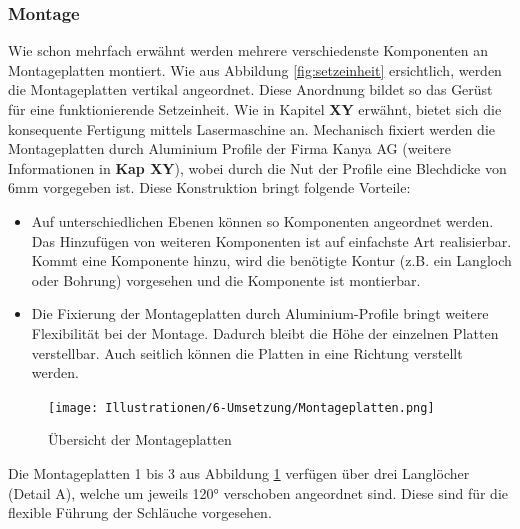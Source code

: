 \subsubsection{Montage}
Wie schon mehrfach erwähnt werden mehrere verschiedenste Komponenten an Montageplatten montiert. Wie aus Abbildung \ref{fig:setzeinheit} ersichtlich, werden die Montageplatten vertikal angeordnet. Diese Anordnung bildet so das Gerüst für eine funktionierende Setzeinheit. Wie in Kapitel \textbf{XY} erwähnt, bietet sich die konsequente Fertigung mittels Lasermaschine an. Mechanisch fixiert werden die Montageplatten durch Aluminium Profile der Firma Kanya AG (weitere Informationen in \textbf{Kap XY}), wobei durch die Nut der Profile eine Blechdicke von 6mm vorgegeben ist. Diese Konstruktion bringt folgende Vorteile:
	\begin{itemize}
	\item Auf unterschiedlichen Ebenen können so Komponenten angeordnet werden. Das Hinzufügen von weiteren Komponenten ist auf einfachste Art realisierbar. Kommt eine Komponente hinzu, wird die benötigte Kontur (z.B. ein Langloch oder Bohrung) vorgesehen und die Komponente ist montierbar.
	\item Die Fixierung der Montageplatten durch Aluminium-Profile bringt weitere Flexibilität bei der Montage. Dadurch bleibt die Höhe der einzelnen Platten verstellbar. Auch seitlich können die Platten in eine Richtung verstellt werden.
\end{itemize}
 	\begin{figure}[H]
	\texttt{[image: Illustrationen/6-Umsetzung/Montageplatten.png]}
	\caption{Übersicht der Montageplatten}
	\label{fig:montageplatten}
\end{figure}
Die Montageplatten 1 bis 3 aus Abbildung \ref{fig:montageplatten} verfügen über drei Langlöcher (Detail A), welche um jeweils 120° verschoben angeordnet sind. Diese sind für die flexible Führung der Schläuche vorgesehen.